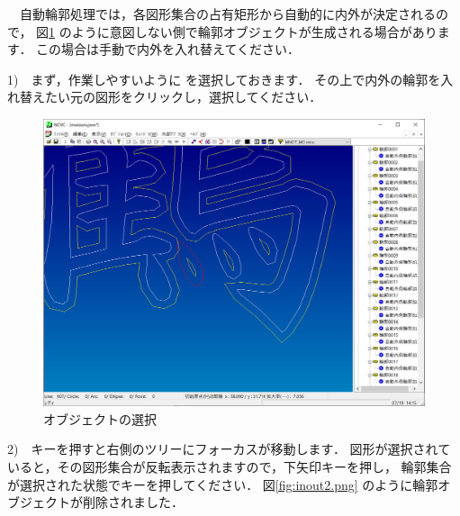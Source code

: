 

\vspace*{1.5zh}
　自動輪郭処理では，各図形集合の占有矩形から自動的に内外が決定されるので，
図\ref{fig:inout1.png} のように意図しない側で輪郭オブジェクトが生成される場合があります．
この場合は手動で内外を入れ替えてください．

\vspace*{1zh}
1)　まず，作業しやすいように
 を選択しておきます．
その上で内外の輪郭を入れ替えたい元の図形をクリックし，選択してください．

\begin{figure}[H]
\centering
\includegraphics[scale=0.5]{No3/fig/inout1.png}
\caption{オブジェクトの選択}
\label{fig:inout1.png}
\end{figure}

\newpage
2)　キーを押すと右側のツリーにフォーカスが移動します．
図形が選択されていると，その図形集合が反転表示されますので，下矢印キーを押し，
輪郭集合が選択された状態でキーを押してください．
図\ref{fig:inout2.png} のように輪郭オブジェクトが削除されました．


